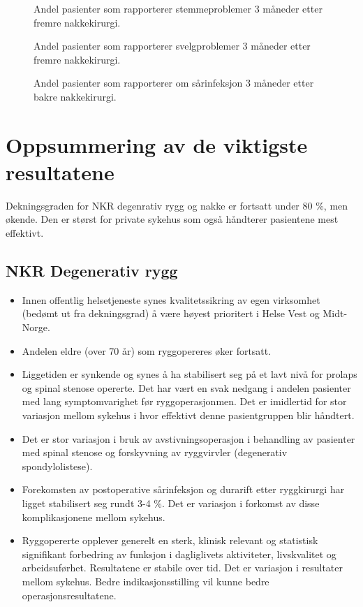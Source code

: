 \begin{figure}[ht]
\caption{\label{fig:NakkeStemme3mndSh} Andel pasienter som rapporterer stemmeproblemer 3 måneder etter fremre nakkekirurgi.}
\end{figure}

\begin{figure}[ht]
\caption{\label{fig:NakkeSvelg3mndSh} Andel pasienter som rapporterer svelgproblemer 3 måneder etter fremre nakkekirurgi.}
\end{figure}

\begin{figure}[ht]
\caption{\label{fig:NakkeKomplinfek3mndSh} Andel pasienter som rapporterer om sårinfeksjon 3 måneder etter bakre nakkekirurgi.}
\end{figure}




\clearpage
\section{Oppsummering av de viktigste resultatene}

Dekningsgraden for NKR degenrativ rygg og nakke er fortsatt under 80 \%, men økende. Den er størst for private sykehus som også håndterer pasientene mest effektivt.
\subsection*{NKR Degenerativ rygg} 
\begin{itemize}
\item Innen offentlig helsetjeneste synes kvalitetssikring  av egen virksomhet (bedømt ut fra dekningsgrad) å
være høyest prioritert i Helse Vest og Midt-Norge.
\item Andelen eldre (over 70 år) som ryggopereres øker fortsatt.
\item Liggetiden er synkende og synes å ha stabilisert seg på et lavt nivå for prolaps og spinal stenose opererte. Det har vært en svak nedgang i andelen pasienter med lang symptomvarighet før ryggoperasjonmen. Det er imidlertid for stor variasjon mellom sykehus i hvor effektivt denne pasientgruppen blir håndtert.
\item Det er stor variasjon i bruk av avstivningsoperasjon i behandling av pasienter med spinal stenose og forskyvning av ryggvirvler (degenerativ spondylolistese).
\item Forekomsten av postoperative sårinfeksjon  og durarift etter ryggkirurgi har ligget stabilisert seg rundt 3-4 \%. Det er  variasjon i forkomst av disse komplikasjonene mellom sykehus. 
\item Ryggopererte opplever generelt en sterk, klinisk relevant og statistisk
signifikant forbedring av funksjon i dagliglivets aktiviteter, livskvalitet og
arbeidsuførhet. Resultatene er stabile over tid. Det er variasjon i resultater mellom sykehus. Bedre indikasjonsstilling vil kunne bedre operasjonsresultatene.
\end{itemize} 
